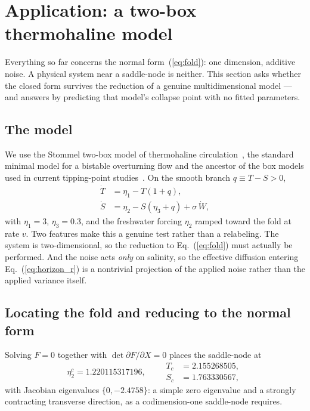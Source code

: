 \documentclass[%
 aip,
 cha,
 amsmath,amssymb,
 reprint,
 superscriptaddress,
 floatfix,
]{revtex4-2}
\begin{document}
\section{\label{sec:stommel}Application: a two-box thermohaline model}

Everything so far concerns the normal form~(\ref{eq:fold}): one dimension, additive noise.  A physical system near a saddle-node is neither.  This section asks whether the closed form survives the reduction of a genuine multidimensional model --- and answers by predicting that model's collapse point with no fitted parameters.

\subsection{The model}

We use the Stommel two-box model of thermohaline circulation~\cite{Stommel1961,Cessi1994}, the standard minimal model for a bistable overturning flow and the ancestor of the box models used in current tipping-point studies~\cite{Alkhayuon2019,Ditlevsen2023}.  On the smooth branch $q\equiv T-S>0$,
\begin{equation}
\label{eq:stommel}
\begin{aligned}
\dot T&=\eta_1-T(1+q),\\
\dot S&=\eta_2-S(\eta_3+q)+\sigma\,\dot W,
\end{aligned}
\end{equation}
with $\eta_1=3$, $\eta_3=0.3$, and the freshwater forcing $\eta_2$ ramped toward the fold at rate $v$.  Two features make this a genuine test rather than a relabeling.  The system is two-dimensional, so the reduction to Eq.~(\ref{eq:fold}) must actually be performed.  And the noise acts \emph{only} on salinity, so the effective diffusion entering Eq.~(\ref{eq:horizon_r}) is a nontrivial projection of the applied noise rather than the applied variance itself.

\subsection{Locating the fold and reducing to the normal form}

Solving $F=0$ together with $\det\partial F/\partial X=0$ places the saddle-node at
\begin{equation}
\eta_2^c=1.220115317196,\qquad
\begin{aligned}
T_c&=2.155268505,\\ S_c&=1.763330567,
\end{aligned}
\end{equation}
with Jacobian eigenvalues $\{0,-2.4758\}$: a simple zero eigenvalue and a strongly contracting transverse direction, as a codimension-one saddle-node requires.
\end{document}
